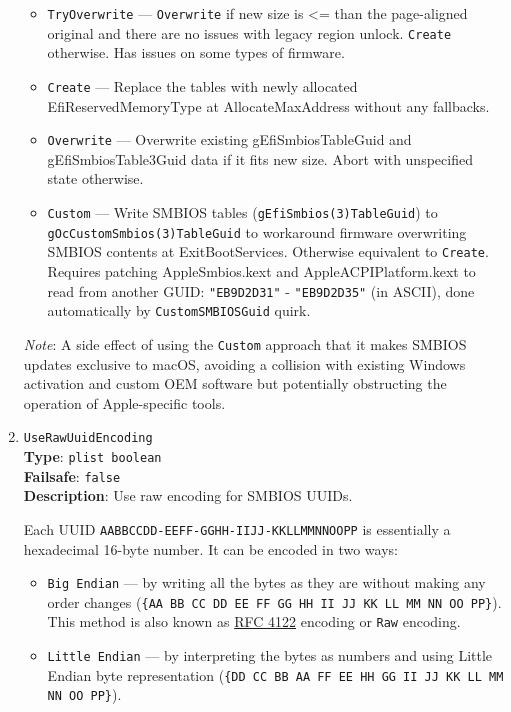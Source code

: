 \documentclass[]{article}
\providecommand{\tightlist}{%
  \setlength{\itemsep}{0pt}\setlength{\parskip}{0pt}}
\begin{document}
\begin{enumerate}
  \begin{itemize}
  \tightlist
  \item
    \texttt{TryOverwrite} --- \texttt{Overwrite} if new size is \textless{}= than
    the page-aligned original and there are no issues with legacy region
    unlock. \texttt{Create} otherwise. Has issues on some types of firmware.
  \item
    \texttt{Create} --- Replace the tables with newly allocated
    EfiReservedMemoryType at AllocateMaxAddress without any fallbacks.
  \item
    \texttt{Overwrite} --- Overwrite existing gEfiSmbiosTableGuid and
    gEfiSmbiosTable3Guid data if it fits new size. Abort with
    unspecified state otherwise.
  \item
    \texttt{Custom} --- Write SMBIOS tables
    (\texttt{gEfiSmbios(3)TableGuid}) to \texttt{gOcCustomSmbios(3)TableGuid}
    to workaround firmware overwriting SMBIOS contents at
    ExitBootServices. Otherwise equivalent to \texttt{Create}. Requires
    patching AppleSmbios.kext and AppleACPIPlatform.kext to read from
    another GUID: \texttt{"EB9D2D31"} - \texttt{"EB9D2D35"} (in ASCII),
    done automatically by \texttt{CustomSMBIOSGuid} quirk.
  \end{itemize}

  \emph{Note}: A side effect of using the \texttt{Custom} approach that it
  makes SMBIOS updates exclusive to macOS, avoiding a collision with existing
  Windows activation and custom OEM software but potentially obstructing
  the operation of Apple-specific tools.
\item
  \texttt{UseRawUuidEncoding}\\
  \textbf{Type}: \texttt{plist\ boolean}\\
  \textbf{Failsafe}: \texttt{false}\\
  \textbf{Description}: Use raw encoding for SMBIOS UUIDs.

  Each UUID \texttt{AABBCCDD-EEFF-GGHH-IIJJ-KKLLMMNNOOPP} is
  essentially a hexadecimal 16-byte number. It can be encoded
  in two ways:

  \begin{itemize}
    \tightlist
    \item \texttt{Big Endian} --- by writing all the bytes as they are without making
      any order changes (\texttt{\{AA BB CC DD EE FF GG HH II JJ KK LL MM NN OO PP\}}).
      This method is also known as \href{https://tools.ietf.org/html/rfc4122}{RFC 4122}
      encoding or \texttt{Raw} encoding.
    \item \texttt{Little Endian} --- by interpreting the bytes as numbers and using
      Little Endian byte representation
      (\texttt{\{DD CC BB AA FF EE HH GG II JJ KK LL MM NN OO PP\}}).
  \end{itemize}


\end{enumerate}
\end{document}
